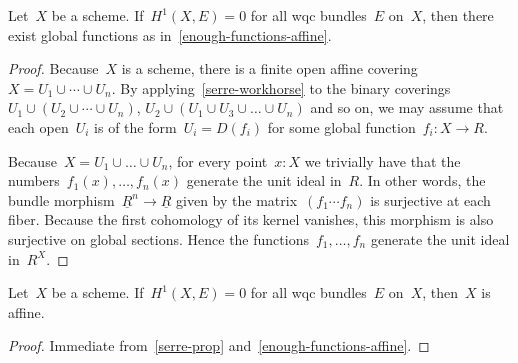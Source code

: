 \begin{proposition}\label{serre-prop}
  Let~$X$ be a scheme. If~$H^1(X, E) = 0$ for all wqc bundles~$E$ on~$X$, then
  there exist global functions as in~\cref{enough-functions-affine}.
\end{proposition}

\begin{proof}
  Because~$X$ is a scheme, there is a finite open affine covering~$X = U_1 \cup
  \cdots \cup U_n$. By applying~\cref{serre-workhorse} to the binary
  coverings~$U_1 \cup (U_2 \cup \cdots \cup U_n)$, $U_2 \cup (U_1 \cup U_3 \cup
  \ldots \cup U_n)$ and so on, we may assume that each open~$U_i$ is of the
  form~$U_i = D(f_i)$ for some global function~$f_i : X \to R$.

  Because~$X = U_1 \cup \dots \cup U_n$, for every point~$x : X$ we trivially
  have that the numbers~$f_1(x),\ldots,f_n(x)$ generate the unit ideal in~$R$.
  In other words, the bundle morphism~$\underline{R}^n \to \underline{R}$ given by
  the matrix~$(f_1 \cdots f_n)$ is surjective at each fiber. Because the first
  cohomology of its kernel vanishes, this morphism is also surjective on global
  sections. Hence the functions~$f_1,\ldots,f_n$ generate the unit ideal
  in~$R^X$.
\end{proof}

\begin{theorem}
  Let~$X$ be a scheme. If~$H^1(X, E) = 0$ for all wqc bundles~$E$
  on~$X$, then~$X$ is affine.
\end{theorem}

\begin{proof}
  Immediate from~\cref{serre-prop} and~\cref{enough-functions-affine}.
\end{proof}
